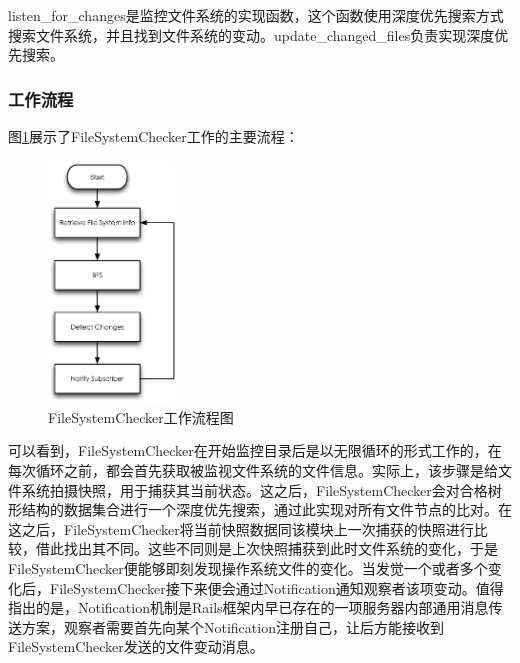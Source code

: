 listen\_for\_changes是监控文件系统的实现函数，这个函数使用深度优先搜索方式搜索文件系统，并且找到文件系统的变动。update\_changed\_files负责实现深度优先搜索。

\subsubsection{工作流程}
图\ref{fig-fuc-process}展示了FileSystemChecker工作的主要流程：

\begin{figure}[h]
\centering
\includegraphics[width=0.3\textwidth]{images/detail/fuc_process.eps}
\caption{FileSystemChecker工作流程图}
\label{fig-fuc-process}
\end{figure}

可以看到，FileSystemChecker在开始监控目录后是以无限循环的形式工作的，在每次循环之前，都会首先获取被监视文件系统的文件信息。实际上，该步骤是给文件系统拍摄快照，用于捕获其当前状态。这之后，FileSystemChecker会对合格树形结构的数据集合进行一个深度优先搜索，通过此实现对所有文件节点的比对。在这之后，FileSystemChecker将当前快照数据同该模块上一次捕获的快照进行比较，借此找出其不同。这些不同则是上次快照捕获到此时文件系统的变化，于是FileSystemChecker便能够即刻发现操作系统文件的变化。当发觉一个或者多个变化后，FileSystemChecker接下来便会通过Notification通知观察者该项变动。值得指出的是，Notification机制是Rails框架内早已存在的一项服务器内部通用消息传送方案，观察者需要首先向某个Notification注册自己，让后方能接收到FileSystemChecker发送的文件变动消息。

